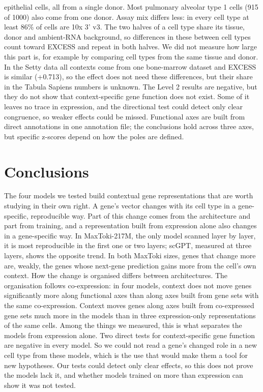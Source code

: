 \documentclass[
  11pt,
]{article}
\begin{document}
epithelial cells, all from a single donor. Most pulmonary alveolar type
1 cells (915 of 1000) also come from one donor. Assay mix differs less:
in every cell type at least 86\% of cells are 10x 3' v3. The two halves
of a cell type share its tissue, donor and ambient-RNA background, so
differences in these between cell types count toward EXCESS and repeat
in both halves. We did not measure how large this part is, for example
by comparing cell types from the same tissue and donor. In the Setty
data all contexts come from one bone-marrow dataset and EXCESS is
similar (+0.713), so the effect does not need these differences, but
their share in the Tabula Sapiens numbers is unknown. The Level 2
results are negative, but they do not show that context-specific gene
function does not exist. Some of it leaves no trace in expression, and
the directional test could detect only clear congruence, so weaker
effects could be missed. Functional axes are built from direct
annotations in one annotation file; the conclusions hold across three
axes, but specific z-scores depend on how the poles are defined.

\section{Conclusions}\label{conclusions}

The four models we tested build contextual gene representations that are
worth studying in their own right. A gene's vector changes with its cell
type in a gene-specific, reproducible way. Part of this change comes
from the architecture and part from training, and a representation built
from expression alone also changes in a gene-specific way. In
MaxToki-217M, the only model scanned layer by layer, it is most
reproducible in the first one or two layers; scGPT, measured at three
layers, shows the opposite trend. In both MaxToki sizes, genes that
change more are, weakly, the genes whose next-gene prediction gains more
from the cell's own context. How the change is organised differs between
architectures. The organisation follows co-expression: in four models,
context does not move genes significantly more along functional axes
than along axes built from gene sets with the same co-expression.
Context moves genes along axes built from co-expressed gene sets much
more in the models than in three expression-only representations of the
same cells. Among the things we measured, this is what separates the
models from expression alone. Two direct tests for context-specific gene
function are negative in every model. So we could not read a gene's
changed role in a new cell type from these models, which is the use that
would make them a tool for new hypotheses. Our tests could detect only
clear effects, so this does not prove the models lack it, and whether
models trained on more than expression can show it was not tested.
\end{document}
